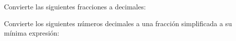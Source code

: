 \documentclass[12pt,addpoints]{evalua}
\begin{document}
\begin{questions}
\begin{multicols}{2}
    \end{multicols}


    \question[4] Convierte las siguientes fracciones a decimales:
   
    \begin{multicols}{2}
    \end{multicols}

    \question[4] Convierte los siguientes números decimales a una fracción simplificada a su mínima expresión:
   
    \begin{multicols}{2}
    \end{multicols}

    \newpage


\end{questions}
\end{document}
